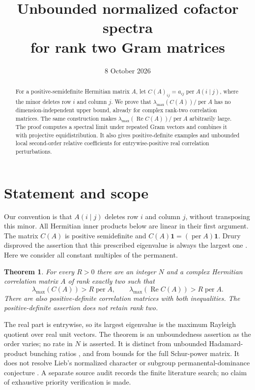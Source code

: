 \documentclass[11pt]{article}
\title{Unbounded normalized cofactor spectra\\for rank two Gram matrices}
\author{}
\date{8 October 2026}
\newtheorem{theorem}{Theorem}
\DeclareMathOperator{\per}{per}
\DeclareMathOperator{\Ree}{Re}
\newcommand{\one}{\mathbf 1}
\begin{document}
\maketitle
\begin{abstract}
For a positive-semidefinite Hermitian matrix $A$, let
$C(A)_{ij}=a_{ij}\per A(i\mid j)$, where the minor deletes row $i$ and column $j$.
We prove that $\lambda_{\max}(C(A))/\per A$ has no dimension-independent upper bound,
already for complex rank-two correlation matrices. The same construction makes
$\lambda_{\max}(\Ree C(A))/\per A$ arbitrarily large. The proof computes a spectral
limit under repeated Gram vectors and combines it with projective equidistribution.
It also gives positive-definite examples and unbounded local second-order relative
coefficients for entrywise-positive real correlation perturbations.
\end{abstract}

\section{Statement and scope}
Our convention is that $A(i\mid j)$ deletes row $i$ and column $j$, without
transposing this minor. All Hermitian inner products below are linear in their
first argument. The matrix $C(A)$ is positive semidefinite and
$C(A)\one=(\per A)\one$. Drury disproved the assertion that this prescribed
eigenvalue is always the largest one \cite{drury}. Here we consider all constant
multiples of the permanent.

\begin{theorem}\label{thm:main}
For every $R>0$ there are an integer $N$ and a complex Hermitian correlation
matrix $A$ of rank exactly two such that
\[
 \lambda_{\max}(C(A))>R\per A,
 \qquad \lambda_{\max}(\Ree C(A))>R\per A.
\]
There are also positive-definite correlation matrices with both inequalities.
The positive-definite assertion does not retain rank two.
\end{theorem}

The real part is entrywise, so its largest eigenvalue is the maximum Rayleigh
quotient over real unit vectors. The theorem is an unboundedness assertion as
the order varies; no rate in $N$ is asserted. It is distinct from unbounded
Hadamard-product bunching ratios \cite{seron}, and from bounds for the full
Schur-power matrix. It does not resolve Lieb's normalized character or subgroup
permanental-dominance conjecture \cite{wanless}. A separate source audit records
the finite literature search; no claim of exhaustive priority verification is made.
\end{document}
